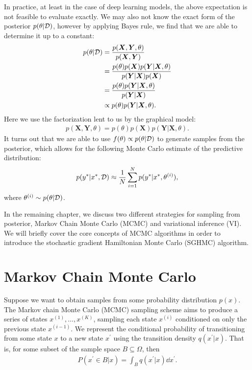 In practice, at least in the case of deep learning models, the above expectation is not feasible to evaluate exactly.
We may also not know the exact form of the posterior $p(\theta|\mathcal{D})$, however by applying Bayes rule, we find that we are able to determine it up to a constant:
\begin{equation} \label{eq:posterior}
    \begin{aligned}
        p(\theta | \mathcal{D}) 
        &= \frac{p(\bm X , \bm Y, \theta)}{p(\bm{X}, \bm{Y})}\\
        &= \frac{p(\theta) p(\bm X) p(\bm Y | \bm X, \theta)}{p(\bm{Y}|\bm{X})p(\bm{X})} \\
        &= \frac{p(\theta) p(\bm Y | \bm X, \theta)}{p(\bm{Y}|\bm{X})} \\
        &\propto p(\theta) p(\bm Y | \bm X, \theta).
    \end{aligned}
\end{equation}
Here we use the factorization lent to us by the graphical model:
\begin{align}
    p(\bm X, \bm Y, \theta) = p(\theta) p(\bm X) p(\bm Y | \bm X, \theta).
\end{align}
It turns out that we are able to use $f(\theta) \propto p(\theta | \mathcal{D})$ to generate samples from the posterior, which allows for the following Monte Carlo estimate of the predictive distribution:
\begin{align}
    p(y^\ast | x^\ast, \mathcal{D})  \approx \frac{1}{N} \sum_{i=1}^N p(y^\ast | x^\ast, \theta^{(i)}),
\end{align}
where $\theta^{(i)}\sim p(\theta | \mathcal{D})$.

In the remaining chapter, we discuss two different strategies for sampling from posterior, Markov Chain Monte Carlo (MCMC) and variational inference (VI).
We will briefly cover the core concepts of MCMC algorithms in order to introduce the stochastic gradient Hamiltonian Monte Carlo (SGHMC) algorithm.

\section{Markov Chain Monte Carlo}

Suppose we want to obtain samples from some probability distribution $p(x)$.
The Markov chain Monte Carlo (MCMC) sampling scheme aims to produce a series of states $x^{(1)},\dots,x^{(K)}$, sampling each state $x^{(i)}$ conditioned on only the previous state $x^{(i-1)}$. 
We represent the conditional probability of transitioning from some state $x$ to a new state $x^\prime$ using the transition density $q(x^\prime | x)$.
That is, for some subset of the sample space $B\subseteq \Omega$, then 
\begin{align}    
    P(x^\prime \in B|x)=\int_{B}q(x^\prime | x)\dd{x^\prime}.
\end{align}

